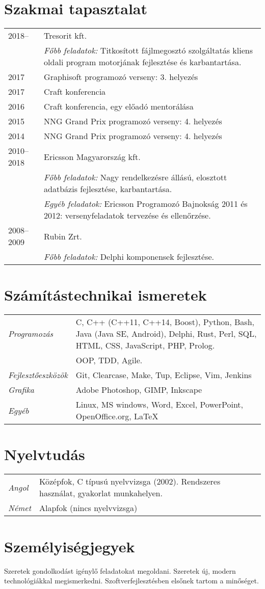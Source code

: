 \documentclass[a4paper,10pt]{article}
\newcommand{\pont}[1]{\emph{#1}}
\begin{document}
\section*{Szakmai tapasztalat}
\begin{tabular}{lp{10cm}}
 2018--&Tresorit kft.\\
  &\emph{Főbb feladatok:} Titkosított fájlmegosztó szolgáltatás kliens oldali program motorjának fejlesztése és karbantartása.\\
 2017&Graphisoft programozó verseny: 3. helyezés\\
 2017&Craft konferencia\\
 2016&Craft konferencia, egy előadó mentorálása\\
 2015&NNG Grand Prix programozó verseny: 4. helyezés\\
 2014&NNG Grand Prix programozó verseny: 4. helyezés\\
 2010--2018&Ericsson Magyarország kft.\\
  &\emph{Főbb feladatok:} Nagy rendelkezésre állású, elosztott adatbázis fejlesztése, karbantartása.\\
  &\emph{Egyéb feladatok:} Ericsson Programozó Bajnokság 2011 és 2012: versenyfeladatok tervezése és ellenőrzése.\\
 2008--2009&Rubin Zrt.\\
  &\emph{Főbb feladatok:} Delphi komponensek fejlesztése.
\end{tabular}

\section*{Számítástechnikai ismeretek}
\begin{tabular}{lp{12cm}}
 \pont{Programozás}&C, C++ (C++11, C++14, Boost), Python, Bash, Java (Java SE, Android), Delphi, Rust, Perl, SQL, HTML, CSS, JavaScript, PHP, Prolog.\\
 &OOP, TDD, Agile.\\
 \pont{Fejlesztőeszközök}&Git, Clearcase, Make, Tup, Eclipse, Vim, Jenkins\\
 \pont{Grafika}&Adobe Photoshop, GIMP, Inkscape\\
 \pont{Egyéb}&Linux, MS windows, Word, Excel, PowerPoint, OpenOffice.org, LaTeX
\end{tabular}

\section*{Nyelvtudás}
\begin{tabular}{ll}
 \pont{Angol}&Középfok, C típusú nyelvvizsga (2002). Rendszeres használat, gyakorlat munkahelyen.\\
 \pont{Német}&Alapfok (nincs nyelvvizsga)
\end{tabular}

\section*{Személyiségjegyek}
Szeretek gondolkodást igénylő feladatokat megoldani. Szeretek új, modern technológiákkal megismerkedni. Szoftverfejlesztésben elsőnek tartom a minőséget.
\end{document}
